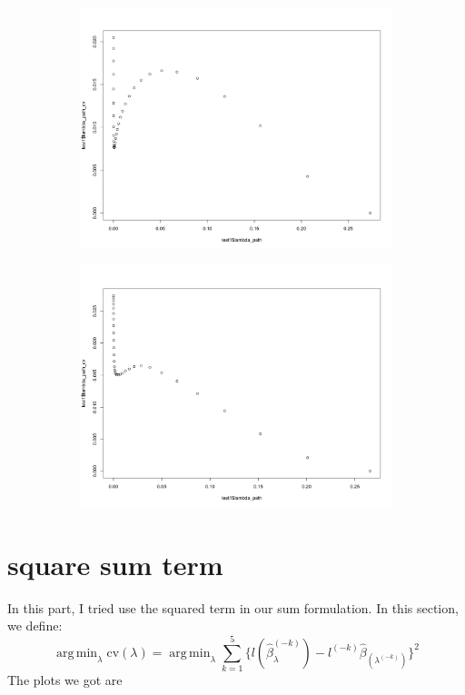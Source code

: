 \documentclass[letterpaper]{article}
\DeclareMathOperator*{\argmin}{arg\,min}
\begin{document}
\begin{figure}[H]
\centering
\begin{subfigure}{0.5\textwidth}
  \centering
  \includegraphics[width=1\linewidth]{./result_plot/ll_use_k/9wrong_path_plot}
\end{subfigure}%
\begin{subfigure}{.5\textwidth}
  \centering
  \includegraphics[width=1\linewidth]{./result_plot/ll_use_k/10wrong_path_plot}
\end{subfigure}

\end{figure}

\section{square sum term}
\label{sec:square}
In this part, I tried use the squared term in our sum formulation.
In this section, we define:
$$
\argmin_{\lambda}\text{cv}(\lambda)=\argmin_{\lambda}\sum_{k=1}^5\{l(\hat{\beta}_\lambda^{(-k)})-l^{(-k)}\hat{\beta}_(\lambda^{(-k)})\}^2
$$
The plots we got are
\end{document}
